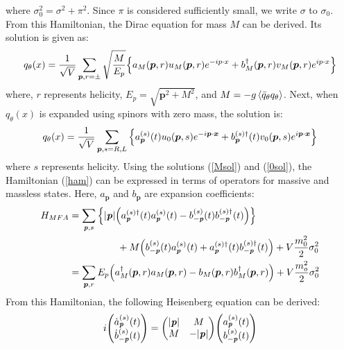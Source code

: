         where $\sigma_0^2 = \sigma^2 + \pi^2$. Since $\pi$ is considered sufficiently small, we write $\sigma$ to $\sigma_0$.  
        From this Hamiltonian, the Dirac equation for mass $M$ can be derived. Its solution is given as:  
        \begin{eqnarray}
            \label{Msol}
            q_\theta (x)=\frac{1}{\sqrt{V}}\sum_{\bm{p},r=\pm} \sqrt{\frac{M}{E_p}}\qty{a_M(\bm{p},r)u_M(\bm{p},r)e^{-ip\cdot x}+b_M^{\dag}(\bm{p},r)v_M(\bm{p},r)e^{ip\cdot x}}
        \end{eqnarray}
        where, $r$ represents helicity, $E_p = \sqrt{\bm{p}^2 + M^2}$, and $M = -g\ev{\bar{q}_\theta q_\theta}$.  
        Next, when $q_\theta(x)$ is expanded using spinors with zero mass, the solution is:  
        \begin{eqnarray}
            \label{0sol}
            q_\theta (x)=\frac{1}{\sqrt{V}}\sum_{\bm{p},s=R,L}\qty{a_{\bm{p}}^{(s)}(t)u_0(\bm{p},s)e^{-i\bm{p}\cdot \bm{x}}+b_{\bm{p}}^{(s)\dag}(t)v_0(\bm{p},s)e^{i\bm{p}\cdot \bm{x}}}
        \end{eqnarray}
        where $s$ represents helicity.  
        Using the solutions (\ref{Msol}) and (\ref{0sol}), the Hamiltonian (\ref{ham}) can be expressed in terms of operators for massive and massless states. Here, $a_{\bm{p}}$ and $b_{\bm{p}}$ are expansion coefficients:  
        \begin{align}
            \label{hamenzan}
            H_{MFA} &= \sum_{\textbf{\textit{p}},s} 
            \qty{|\textbf{\textit{p}}| 
            \qty(a_{\textbf{\textit{p}}}^{(s)\dag}(t) a_{\textbf{\textit{p}}}^{(s)}(t) 
            - b_{-\textbf{\textit{p}}}^{(s)}(t)b_{-\textbf{\textit{p}}}^{(s)\dag}(t))} \notag \\
            &\hspace{5em} + M \qty(b_{-\textbf{\textit{p}}}^{(s)}(t)a_{\textbf{\textit{p}}}^{(s)}(t) 
            + a_{\textbf{\textit{p}}}^{(s)\dag}(t) b_{-\textbf{\textit{p}}}^{(s)\dag}(t)) 
            + V \frac{m_0^2}{2} \sigma_0^2 \\
            \label{massfinite}
            &= \sum_{\bm{p},r} E_p 
            \qty(a^\dagger_M(\bm{p},r)a_M(\bm{p},r) 
            - b_M(\bm{p},r)b^\dagger_M(\bm{p},r)) 
            + V \frac{m_o^2}{2} \sigma_0^2
        \end{align}
        From this Hamiltonian, the following Heisenberg equation can be derived:  
        \begin{eqnarray}
            \label{massless_Heisenberg_e.q.}
            i \mqty(\dot{a}_{\textbf{\textit{p}}}^{(s)}(t)\\\dot{b}_{-\textbf{\textit{p}}}^{(s)}(t))=\mqty(|\textbf{\textit{p}}|&M\\M&-|\textbf{\textit{p}}|)\mqty(a_{\textbf{\textit{p}}}^{(s)}(t)\\b_{-\textbf{\textit{p}}}^{(s)}(t))
        \end{eqnarray}
